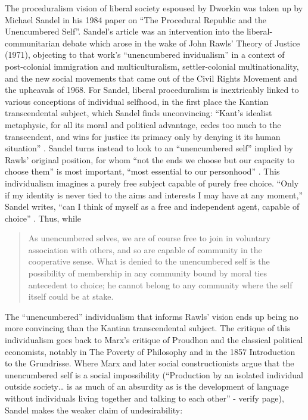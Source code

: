 \documentclass[12pt,oneside]{memoir}
\begin{document}
The proceduralism vision of liberal society espoused by Dworkin was taken up by Michael Sandel in his 1984 paper on ``The Procedural Republic and the Unencumbered Self''. Sandel's article was an intervention into the liberal-communitarian debate which arose in the wake of John Rawls' Theory of Justice (1971), objecting to that work's ``unencumbered invidualism'' in a context of post-colonial immigration and multiculturalism, settler-colonial multinationality, and the new social movements that came out of the Civil Rights Movement and the upheavals of 1968. For Sandel, liberal proceduralism is inextricably linked to various conceptions of individual selfhood, in the first place the Kantian transcendental subject, which Sandel finds unconvincing: ``Kant's idealist metaphysic, for all its moral and political advantage, cedes too much to the transcendent, and wins for justice its primacy only by denying it its human situation'' \citep[85]{Sandel1984}. Sandel turns instead to look to an ``unencumbered self'' implied by Rawls' original position, for whom ``not the ends we choose but our capacity to choose them'' is most important, ``most essential to our personhood'' \citep[86]{Sandel1984}. This individualism imagines a purely free subject capable of purely free choice. ``Only if my identity is never tied to the aims and interests I may have at any moment,'' Sandel writes, ``can I think of myself as a free and independent agent, capable of choice'' \citep[86]{Sandel1984}. Thus, while

\begin{quote}

As unencumbered selves, we are of course free to join in voluntary association with others, and so are capable of community in the cooperative sense. What is denied to the unencumbered self is the possibility of membership in any community bound by moral ties antecedent to choice; he cannot belong to any community where the self itself could be at stake. \cite[86-87]{Sandel1984}

\end{quote}

The ``unencumbered'' individualism that informs Rawls' vision ends up being no more convincing than the Kantian transcendental subject. The critique of this individualism goes back to Marx's critique of Proudhon and the classical political economists, notably in The Poverty of Philosophy and in the 1857 Introduction to the Grundrisse. Where Marx and later social constructionists argue that the unencumbered self is a social impossibility (``Production by an isolated individual outside society{\ldots} is as much of an absurdity as is the development of language without individuals living together and talking to each other'' \cite[17]{Marx1973} - verify page), Sandel makes the weaker claim of undesirability:
\end{document}
